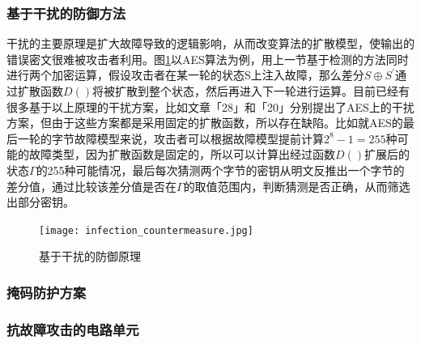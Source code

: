 \documentclass[a4paper,12pt]{article}
\begin{document}
\begin{CJK}{UTF8}{gkai}
\subsubsection{基于干扰的防御方法}
干扰的主要原理是扩大故障导致的逻辑影响，从而改变算法的扩散模型，使输出的错误密文很难被攻击者利用。图\ref{infection_countermeasure}以AES算法为例，用上一节基于检测的方法同时进行两个加密运算，假设攻击者在某一轮的状态S上注入故障，那么差分$S \oplus S^'$通过扩散函数$D()$将被扩散到整个状态，然后再进入下一轮进行运算。目前已经有很多基于以上原理的干扰方案，比如文章「28」和「20」分别提出了AES上的干扰方案，但由于这些方案都是采用固定的扩散函数，所以存在缺陷。比如就AES的最后一轮的字节故障模型来说，攻击者可以根据故障模型提前计算$2^8-1=255$种可能的故障类型，因为扩散函数是固定的，所以可以计算出经过函数$D()$扩展后的状态$\Gamma$的255种可能情况，最后每次猜测两个字节的密钥从明文反推出一个字节的差分值，通过比较该差分值是否在$\Gamma$的取值范围内，判断猜测是否正确，从而筛选出部分密钥。

\begin{figure}
\centering
\caption{基于干扰的防御原理}
\texttt{[image: infection\_countermeasure.jpg]}
\label{infection_countermeasure}
\end{figure}

\subsubsection{掩码防护方案}
\subsubsection{抗故障攻击的电路单元}
\end{CJK}
\end{document}
